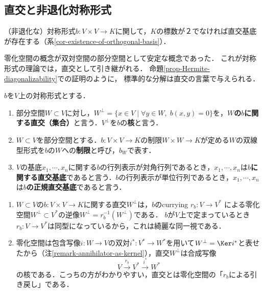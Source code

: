 \documentclass[uplatex, dvipdfmx]{jsreport}
\begin{document}
\subsection{直交と非退化対称形式}

\begin{tcolorbox}[colframe=ForestGreen, colback=ForestGreen!10!white, breakable]
    （非退化な）対称形式$b:V\times V\to K$に関して，$K$の標数が２でなければ直交基底が存在する（系\ref{cor-existence-of-orthogonal-basis}）．

    零化空間の概念が双対空間の部分空間として安定な概念であった．
    これが対称形式の理論では，直交として引き継がれる．
    命題\ref{prop-Hermite-diagonalizability}での証明のように，
    標準的な分解は直交の言葉で与えられる．
\end{tcolorbox}

\begin{definition}
    $b$を$V$上の対称形式とする．
    \begin{enumerate}
        \item 部分空間$W\subset V$に対し，$W^\perp = \{ x\in V\mid \forall y\in W,\;b(x,y)=0 \}$を，\textbf{$W$の$b$に関する直交（集合）}と言う．$V^\perp$を$b$の\textbf{核}と言う．
        \item $W\subset V$を部分空間とする．$b:V\times V\to K$の制限$W\times W\to K$が定める$W$の双線型形式を$b$の$W$への\textbf{制限}と呼び，$b_W$で表す．
        \item $V$の基底$x_1,\cdots,x_n$に関する$b$の行列表示が対角行列であるとき，$x_1,\cdots,x_n$は\textbf{$b$に関する直交基底}であると言う．$b$の行列表示が単位行列であるとき，$x_1,\cdots,x_n$は\textbf{$b$の正規直交基底}であると言う．
    \end{enumerate}
\end{definition}
\begin{remark}\label{remark-orthogonal-as-kernel}\mbox{}
    \begin{enumerate}
        \item $W\subset V$の$b:V\times V\to K$に関する直交$W^\perp$は，$b$のcurrying $r_b:V\to V^*$
        による零化空間$W^\bot\subset V^*$の逆像$W^\perp=r_b^{-1}(W^\bot)$である．
        $b$が$V$上で定まっているとき$r_b:V\to V^*$は同型になっているから，これは綺麗な同一視である．
        \item 零化空間は包含写像$i:W\to V$の双対$i^*:V^*\to W^*$を用いて$W^\bot=\Ker i^*$と表せたから（注\ref{remark-annihilator-as-kernel}），直交$W^\perp$は合成写像
        \[V\xrightarrow{r_b}V^*\xrightarrow{i^*}W^*\]
        の核である．こっちの方がわかりやすい，直交とは零化空間の「$r_b$による引き戻し」である．
    \end{enumerate}
\end{remark}
\end{document}
